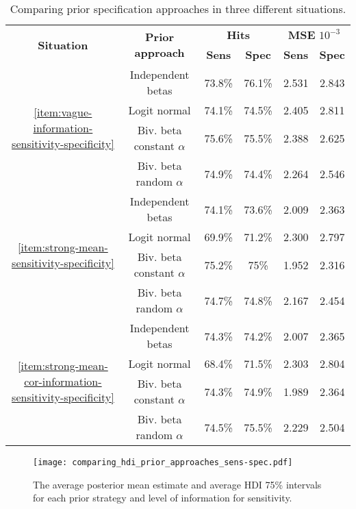 \begin{table}[tbp]
  \centering
  \caption{\label{tab:comparison-prior-approach-sensitivity-specificity}Comparing
  prior specification approaches in three different situations.}
  \begin{tabular}{cccccc}
    \hline
    \multirow{2}{*}{\textbf{Situation}} & \multirow{2}{*}{\textbf{Prior
    approach}} & \multicolumn{2}{c}{\textbf{Hits}} &
    \multicolumn{2}{c}{\textbf{MSE} $10^{-3}$} \\ \cline{3-6} 
     &  & \textbf{Sens} & \textbf{Spec} & \textbf{Sens} & \textbf{Spec} \\ \hline
    \multirow{4}{*}{\autoref{item:vague-information-sensitivity-specificity}} & Independent betas & 73.8\% & 76.1\% & 2.531 & 2.843 \\
     & Logit normal & 74.1\% & 74.5\% & 2.405 & 2.811 \\
     & Biv. beta constant $\alpha$ & 75.6\% & 75.5\% & 2.388 & 2.625 \\
     & Biv. beta random $\alpha$ & 74.9\% & 74.4\% & 2.264 & 2.546 \\\hline
    \multirow{4}{*}{\autoref{item:strong-mean-sensitivity-specificity}} & Independent betas & 74.1\% & 73.6\% & 2.009 & 2.363 \\
     & Logit normal & 69.9\% & 71.2\% & 2.300 & 2.797 \\
     & Biv. beta constant $\alpha$ & 75.2\% & 75\% & 1.952 & 2.316 \\
     & Biv. beta random $\alpha$ & 74.7\% & 74.8\% & 2.167 & 2.454 \\\hline
    \multirow{4}{*}{\autoref{item:strong-mean-cor-information-sensitivity-specificity}} & Independent betas & 74.3\% & 74.2\% & 2.007 & 2.365 \\
     & Logit normal & 68.4\% & 71.5\% & 2.303 & 2.804 \\
     & Biv. beta constant $\alpha$ & 74.3\% & 74.9\% & 1.989 & 2.364 \\
     & Biv. beta random $\alpha$ & 74.5\% & 75.5\% & 2.229 & 2.504 \\ \hline
    \end{tabular}
  \end{table}

\begin{figure}
  \centering
  \caption{\label{fig:comparing_hdi_prior_approaches_sens-spec}The average
  posterior mean estimate and average HDI 75\% intervals
  for each prior strategy and level of information for sensitivity.}
  \texttt{[image: comparing\_hdi\_prior\_approaches\_sens-spec.pdf]}
\end{figure}

